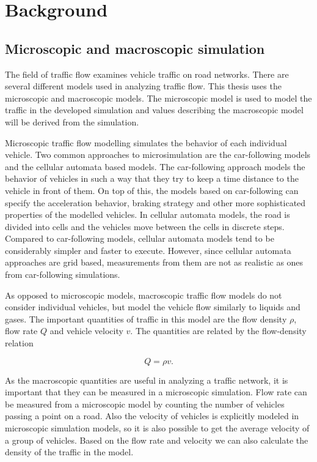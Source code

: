 \documentclass[english, 12pt, a4paper, elec, utf8, pdfa, online]{aaltothesis}
\begin{document}
\clearpage

\section{Background}

\subsection{Microscopic and macroscopic simulation}

The field of traffic flow examines vehicle traffic on road networks. There are several different models used in analyzing traffic flow. This thesis uses the microscopic and macroscopic models. The microscopic model is used to model the traffic in the developed simulation and values describing the macroscopic model will be derived from the simulation.

Microscopic traffic flow modelling simulates the behavior of each individual vehicle. Two common approaches to microsimulation are the car-following models and the cellular automata based models. The car-following approach models the behavior of vehicles in such a way that they try to keep a time distance to the vehicle in front of them. On top of this, the models based on car-following can specify the acceleration behavior, braking strategy and other more sophisticated properties of the modelled vehicles. In cellular automata models, the road is divided into cells and the vehicles move between the cells in discrete steps. Compared to car-following models, cellular automata models tend to be considerably simpler and faster to execute. However, since cellular automata approaches are grid based, measurements from them are not as realistic as ones from car-following simulations.

As opposed to microscopic models, macroscopic traffic flow models do not consider individual vehicles, but model the vehicle flow similarly to liquids and gases. The important quantities of traffic in this model are the flow density $\rho$, flow rate $Q$ and vehicle velocity $v$. The quantities are related by the flow-density relation

\[ Q = \rho v .\]

As the macroscopic quantities are useful in analyzing a traffic network, it is important that they can be measured in a microscopic simulation. Flow rate can be measured from a microscopic model by counting the number of vehicles passing a point on a road. Also the velocity of vehicles is explicitly modeled in microscopic simulation models, so it is also possible to get the average velocity of a group of vehicles. Based on the flow rate and velocity we can also calculate the density of the traffic in the model. \cite{treiber}
\end{document}
